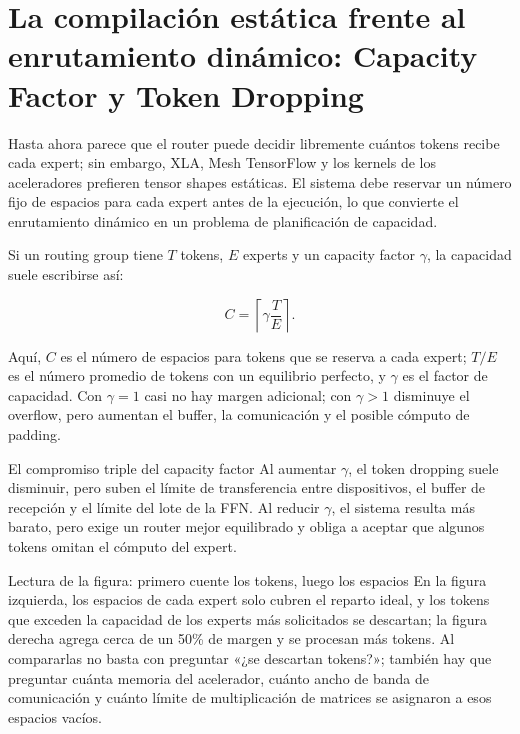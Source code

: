 \section{La compilación estática frente al enrutamiento dinámico: Capacity Factor y Token Dropping}

Hasta ahora parece que el router puede decidir libremente cuántos tokens recibe cada expert; sin embargo, XLA, Mesh TensorFlow y los kernels de los aceleradores prefieren tensor shapes estáticas. El sistema debe reservar un número fijo de espacios para cada expert antes de la ejecución, lo que convierte el enrutamiento dinámico en un problema de planificación de capacidad.


Si un routing group tiene $T$ tokens, $E$ experts y un capacity factor $\gamma$, la capacidad suele escribirse así:

\[
C=\left\lceil \gamma\frac{T}{E}\right\rceil.
\]

Aquí, $C$ es el número de espacios para tokens que se reserva a cada expert; $T/E$ es el número promedio de tokens con un equilibrio perfecto, y $\gamma$ es el factor de capacidad. Con $\gamma=1$ casi no hay margen adicional; con $\gamma>1$ disminuye el overflow, pero aumentan el buffer, la comunicación y el posible cómputo de padding.

\begin{importantbox}{El compromiso triple del capacity factor}
Al aumentar $\gamma$, el token dropping suele disminuir, pero suben el límite de transferencia entre dispositivos, el buffer de recepción y el límite del lote de la FFN. Al reducir $\gamma$, el sistema resulta más barato, pero exige un router mejor equilibrado y obliga a aceptar que algunos tokens omitan el cómputo del expert.
\end{importantbox}


\begin{knowledgebox}{Lectura de la figura: primero cuente los tokens, luego los espacios}
En la figura izquierda, los espacios de cada expert solo cubren el reparto ideal, y los tokens que exceden la capacidad de los experts más solicitados se descartan; la figura derecha agrega cerca de un 50\% de margen y se procesan más tokens. Al compararlas no basta con preguntar «¿se descartan tokens?»; también hay que preguntar cuánta memoria del acelerador, cuánto ancho de banda de comunicación y cuánto límite de multiplicación de matrices se asignaron a esos espacios vacíos.
\end{knowledgebox}

